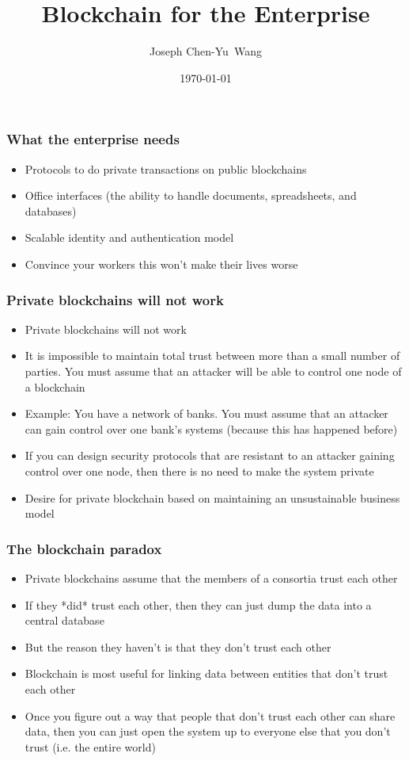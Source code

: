 \documentclass{beamer}
\title {Blockchain for the Enterprise}
\author{Joseph Chen-Yu~Wang}
\institute{Bitquant Research Laboratories (Asia) Limited\\
  in association with the Banzai Institute of Advanced Research\\
  and the Hong Kong Caviliers}
\date{\today}
\begin{document}
\frame{\titlepage}
\begin{frame}
  \frametitle{What the enterprise needs}
  \begin{itemize}
  \item Protocols to do private transactions on public blockchains
  \item Office interfaces (the ability to handle documents,
    spreadsheets, and databases)
  \item Scalable identity and authentication model
  \item Convince your workers this won't make their lives worse
  \end{itemize}
\end{frame}
\begin{frame}
  \frametitle{Private blockchains will not work}
  \begin{itemize}
  \item Private blockchains will not work
  \item It is impossible to maintain total trust between more than a
    small number of parties.  You must assume that an attacker will be
    able to control one node of a blockchain
  \item Example: You have a network of banks.  You must assume that an
    attacker can gain control over one bank's systems (because this
    has happened before)
  \item If you can design security protocols that are resistant to an
    attacker gaining control over one node, then there is no need to
    make the system private
  \item Desire for private blockchain based on maintaining an
    unsustainable business model
  \end{itemize}
\end{frame}
\begin{frame}
  \frametitle{The blockchain paradox}
  \begin{itemize}
    \item Private blockchains assume that the members of a consortia
      trust each other
    \item If they *did* trust each other, then they can just dump the
      data into a central database
    \item But the reason they haven't is that they don't trust each other
    \item Blockchain is most useful for linking data between entities
      that don't trust each other
    \item Once you figure out a way that people that don't trust each
      other can share data, then you can just open the system up to
      everyone else that you don't trust (i.e. the entire world)
  \end{itemize}
\end{frame}
\end{document}

